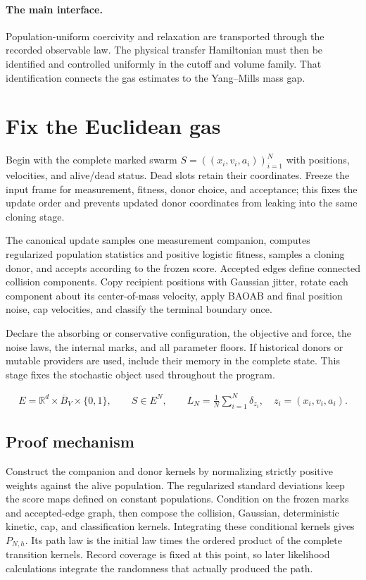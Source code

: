 \documentclass[11pt,a4paper]{article}
\begin{document}
\paragraph{The main interface.} Population-uniform coercivity and relaxation are transported through the recorded observable law. The physical transfer Hamiltonian must then be identified and controlled uniformly in the cutoff and volume family. That identification connects the gas estimates to the Yang--Mills mass gap.

\section{Fix the Euclidean gas}
\label{stage:1}
Begin with the complete marked swarm \(S=((x_i,v_i,a_i))_{i=1}^N\) with positions, velocities, and alive/dead status. Dead slots retain their coordinates. Freeze the input frame for measurement, fitness, donor choice, and acceptance; this fixes the update order and prevents updated donor coordinates from leaking into the same cloning stage.

The canonical update samples one measurement companion, computes regularized population statistics and positive logistic fitness, samples a cloning donor, and accepts according to the frozen score. Accepted edges define connected collision components. Copy recipient positions with Gaussian jitter, rotate each component about its center-of-mass velocity, apply BAOAB and final position noise, cap velocities, and classify the terminal boundary once.

Declare the absorbing or conservative configuration, the objective and force, the noise laws, the internal marks, and all parameter floors. If historical donors or mutable providers are used, include their memory in the complete state. This stage fixes the stochastic object used throughout the program.


\begin{gather*}
E=\mathbb R^d\times\overline B_V\times\{0,1\},\qquad S\in E^N,\qquad L_N=\frac1N\sum_{i=1}^N\delta_{z_i},\quad z_i=(x_i,v_i,a_i).
\end{gather*}
\subsection*{Proof mechanism}
Construct the companion and donor kernels by normalizing strictly positive weights against the alive population. The regularized standard deviations keep the score maps defined on constant populations. Condition on the frozen marks and accepted-edge graph, then compose the collision, Gaussian, deterministic kinetic, cap, and classification kernels. Integrating these conditional kernels gives \(P_{N,h}\). Its path law is the initial law times the ordered product of the complete transition kernels. Record coverage is fixed at this point, so later likelihood calculations integrate the randomness that actually produced the path.
\end{document}
